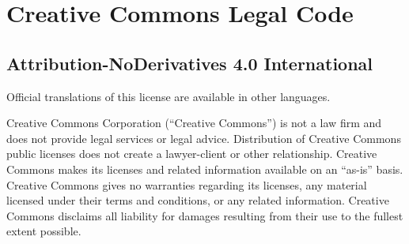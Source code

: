 \begin{comment}
\end{comment}

\section{Creative Commons Legal Code}

\subsection{Attribution-NoDerivatives 4.0 International}






Official translations of this license are available in other languages.



\par Creative Commons Corporation (“Creative Commons”) is not a law firm and does not provide legal services or legal advice. Distribution of Creative Commons public licenses does not create a lawyer-client or other relationship. Creative Commons makes its licenses and related information available on an “as-is” basis. Creative Commons gives no warranties regarding its licenses, any material licensed under their terms and conditions, or any related information. Creative Commons disclaims all liability for damages resulting from their use to the fullest extent possible.


